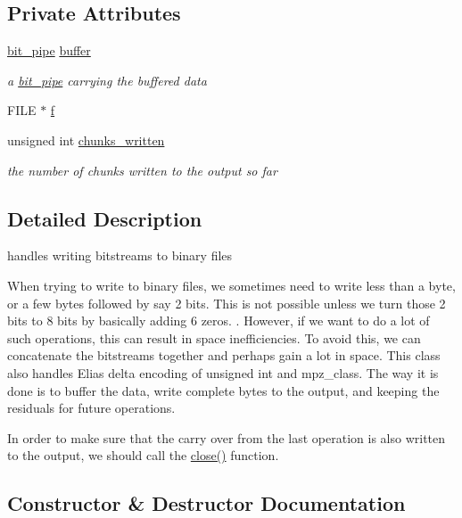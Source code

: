 \subsection*{Private Attributes}
\begin{DoxyCompactItemize}
\item 
\hyperlink{classbit__pipe}{bit\+\_\+pipe} \hyperlink{classobitstream_aeaccad00a395a404aa16472bfa052be3}{buffer}
\begin{DoxyCompactList}\small\item\em a \hyperlink{classbit__pipe}{bit\+\_\+pipe} carrying the buffered data \end{DoxyCompactList}\item 
F\+I\+LE $\ast$ \hyperlink{classobitstream_ac589d74745217748c888ae777ab324a7}{f}
\item 
unsigned int \hyperlink{classobitstream_a3022397f2b6133ea5990016d9d078a2f}{chunks\+\_\+written}
\begin{DoxyCompactList}\small\item\em the number of chunks written to the output so far \end{DoxyCompactList}\end{DoxyCompactItemize}


\subsection{Detailed Description}
handles writing bitstreams to binary files 

When trying to write to binary files, we sometimes need to write less than a byte, or a few bytes followed by say 2 bits. This is not possible unless we turn those 2 bits to 8 bits by basically adding 6 zeros. . However, if we want to do a lot of such operations, this can result in space inefficiencies. To avoid this, we can concatenate the bitstreams together and perhaps gain a lot in space. This class also handles Elias delta encoding of unsigned int and mpz\+\_\+class. The way it is done is to buffer the data, write complete bytes to the output, and keeping the residuals for future operations.

In order to make sure that the carry over from the last operation is also written to the output, we should call the \hyperlink{classobitstream_a6d76dbba302e1181fbc9609072a4c2a0}{close()} function. 

\subsection{Constructor \& Destructor Documentation}
\mbox{\label{classobitstream_a99e4f20344a99c1e8d892eb0c28b3daa}} 
